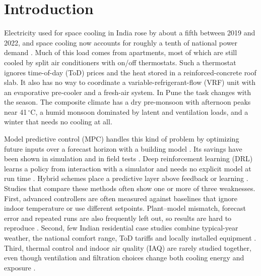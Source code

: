 
\section{Introduction}\label{sec:intro}
Electricity used for space cooling in India rose by about a fifth between 2019 and
2022, and space cooling now accounts for roughly a tenth of national power demand
\cite{iea2023}. Much of this load comes from apartments, most of which are still
cooled by split air conditioners with on/off thermostats. Such a thermostat ignores
time-of-day (ToD) prices and the heat stored in a reinforced-concrete roof slab. It
also has no way to coordinate a variable-refrigerant-flow (VRF) unit with an
evaporative pre-cooler and a fresh-air system. In Pune the task changes with the
season. The composite climate has a dry pre-monsoon with afternoon peaks near
41\,$^\circ$C, a humid monsoon dominated by latent and ventilation loads, and a winter
that needs no cooling at all.

Model predictive control (MPC) handles this kind of problem by optimizing future inputs
over a forecast horizon with a building model \cite{drgona2020,afram2014}. Its savings
have been shown in simulation and in field tests \cite{oldewurtel2012,yao2021}. Deep reinforcement learning (DRL) learns a policy from
interaction with a simulator and needs no explicit model at run time
\cite{wei2017,wanghong2020,yu2021,sierla2022}. Hybrid schemes place a predictive layer
above feedback or learning \cite{arroyo2022}. Studies that compare these
methods often show one or more of three weaknesses. First, advanced controllers are often measured against
baselines that ignore indoor temperature or use different setpoints. Plant--model
mismatch, forecast error and repeated runs are also frequently left out, so results are
hard to reproduce \cite{blum2021,wangdong2024}. Second, few Indian residential
case studies combine typical-year weather, the national comfort range, ToD tariffs and
locally installed equipment \cite{manu2016}. Third, thermal control and indoor air
quality (IAQ) are rarely studied together, even though ventilation and filtration
choices change both cooling energy and exposure \cite{belias2022}.

